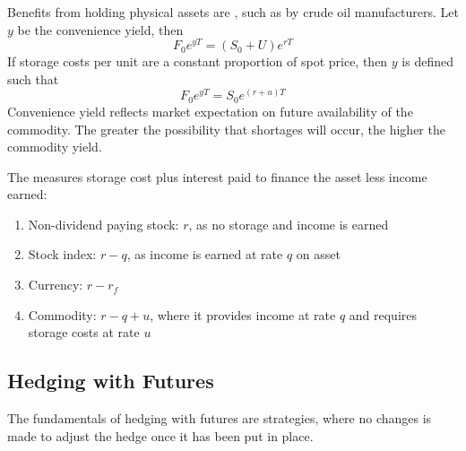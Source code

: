 \documentclass[a4paper,oneside,openany]{book}
\begin{document}
Benefits from holding physical assets are , such as by crude oil manufacturers. Let $y$ be the convenience yield, then
\begin{equation*}
F_0 e^{yT} = (S_0 + U)e^{rT} \nonumber
\end{equation*}
If storage costs per unit are a constant proportion of spot price, then $y$ is defined such that
\begin{equation*}
F_0 e^{yT} = S_0 e^{(r+u)T} \nonumber
\end{equation*}
Convenience yield reflects market expectation on future availability of the commodity. The greater the possibility that shortages will occur, the higher the commodity yield.

The  measures storage cost plus interest paid to finance the asset less income earned:
\begin{enumerate}[label=\roman*.]
\setlength{\itemsep}{0pt}
\item Non-dividend paying stock: $r$, as no storage and income is earned
\item Stock index: $r-q$, as income is earned at rate $q$ on asset
\item Currency: $r - r_f$
\item Commodity: $r-q+u$, where it provides income at rate $q$ and requires storage costs at rate $u$
\end{enumerate}

\subsection{Hedging with Futures}

The fundamentals of hedging with futures are  strategies, where no changes is made to adjust the hedge once it has been put in place.
\end{document}
